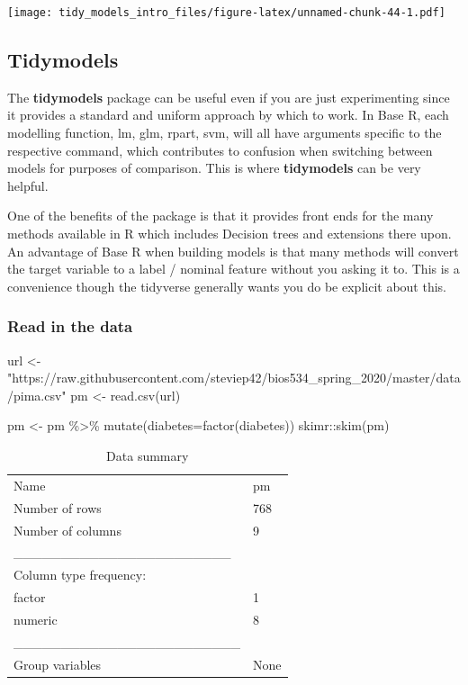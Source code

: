 \documentclass[
]{article}
\newenvironment{Shaded}{\begin{snugshade}}{\end{snugshade}}
\newcommand{\AttributeTok}[1]{\textcolor[rgb]{0.77,0.63,0.00}{#1}}
\newcommand{\FunctionTok}[1]{\textcolor[rgb]{0.00,0.00,0.00}{#1}}
\newcommand{\NormalTok}[1]{#1}
\newcommand{\OtherTok}[1]{\textcolor[rgb]{0.56,0.35,0.01}{#1}}
\newcommand{\SpecialCharTok}[1]{\textcolor[rgb]{0.00,0.00,0.00}{#1}}
\newcommand{\StringTok}[1]{\textcolor[rgb]{0.31,0.60,0.02}{#1}}
\begin{document}
\texttt{[image: tidy\_models\_intro\_files/figure-latex/unnamed-chunk-44-1.pdf]}

\hypertarget{tidymodels}{%
\subsection{Tidymodels}\label{tidymodels}}

The \textbf{tidymodels} package can be useful even if you are just
experimenting since it provides a standard and uniform approach by which
to work. In Base R, each modelling function, lm, glm, rpart, svm, will
all have arguments specific to the respective command, which contributes
to confusion when switching between models for purposes of comparison.
This is where \textbf{tidymodels} can be very helpful.

One of the benefits of the package is that it provides front ends for
the many methods available in R which includes Decision trees and
extensions there upon. An advantage of Base R when building models is
that many methods will convert the target variable to a label / nominal
feature without you asking it to. This is a convenience though the
tidyverse generally wants you do be explicit about this.

\hypertarget{read-in-the-data}{%
\subsubsection{Read in the data}\label{read-in-the-data}}

\begin{Shaded}
\begin{Highlighting}[]
\NormalTok{url }\OtherTok{\textless{}{-}} \StringTok{"https://raw.githubusercontent.com/steviep42/bios534\_spring\_2020/master/data/pima.csv"}
\NormalTok{pm }\OtherTok{\textless{}{-}} \FunctionTok{read.csv}\NormalTok{(url)}

\NormalTok{pm }\OtherTok{\textless{}{-}}\NormalTok{ pm }\SpecialCharTok{\%\textgreater{}\%} \FunctionTok{mutate}\NormalTok{(}\AttributeTok{diabetes=}\FunctionTok{factor}\NormalTok{(diabetes))}
\NormalTok{skimr}\SpecialCharTok{::}\FunctionTok{skim}\NormalTok{(pm)}
\end{Highlighting}
\end{Shaded}

\begin{longtable}[]{@{}ll@{}}
\caption{Data summary}\tabularnewline
\toprule
\endhead
Name & pm \\
Number of rows & 768 \\
Number of columns & 9 \\
\_\_\_\_\_\_\_\_\_\_\_\_\_\_\_\_\_\_\_\_\_\_\_ & \\
Column type frequency: & \\
factor & 1 \\
numeric & 8 \\
\_\_\_\_\_\_\_\_\_\_\_\_\_\_\_\_\_\_\_\_\_\_\_\_ & \\
Group variables & None \\
\bottomrule
\end{longtable}
\end{document}
